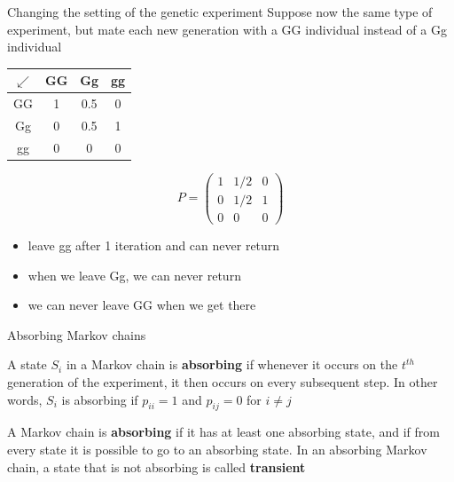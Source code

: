 \documentclass[aspectratio=169]{beamer}
\begin{document}
\begin{frame}{Changing the setting of the genetic experiment}
Suppose now the same type of experiment, but mate each new generation with a GG individual instead of a Gg individual
\vfill
\begin{center}
\end{center}
\vfill
\begin{minipage}{0.45\textwidth}
	\begin{center}
		\begin{tabular}{c|ccc}
		$\swarrow$ & GG & Gg & gg \\
		\hline
		GG & 1 & 0.5 & 0 \\
		Gg & 0 & 0.5 & 1 \\
		gg & 0 & 0 & 0
		\end{tabular}
	\end{center}
\end{minipage}
\begin{minipage}{0.45\textwidth}
	\[
		P=\begin{pmatrix}
		1 & 1/2 & 0 \\[5pt]
		0 & 1/2 & 1 \\[5pt]
		0 & 0 & 0
		\end{pmatrix}
	\]
\end{minipage}
\begin{itemize}
\item leave gg after 1 iteration and can never return
\item when we leave Gg, we can never return
\item we can never leave GG when we get there
\end{itemize}
\end{frame}


\begin{frame}{Absorbing Markov chains}
\begin{definition}
A state $S_i$ in a Markov chain is \textbf{absorbing} if whenever it occurs on the $t^{th}$ generation of the experiment, it then occurs on every subsequent step. In other words, $S_i$ is absorbing if $p_{ii}=1$ and $p_{ij}=0$ for $i\neq j$
\end{definition}
\vfill
\begin{definition}
A Markov chain is \textbf{absorbing} if it has at least one absorbing state, and if from every state it is possible to go to an absorbing state.
In an absorbing Markov chain, a state that is not absorbing is called \textbf{transient}
\end{definition}
\end{frame}
\end{document}
